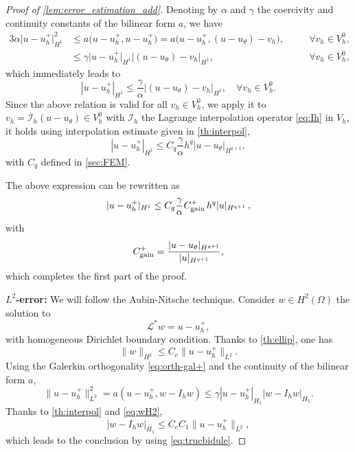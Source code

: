 \begin{proof}[Proof of \cref{lem:error_estimation_add}]
    Denoting by $\alpha$ and $\gamma$ the
    coercivity and continuity constants of the bilinear form $a$, we have
    \begin{alignat*}{3}
        \alpha \big| u-u_h^+\big|_{H^1}^2 & \leq
        a\big(u-u_h^+,u-u_h^+\big) =
        a\big(u-u_h^+,(u-u_{\theta})-v_h\big),
                                          &      & \quad \forall v_h \in V_h^0, \\
                                          & \leq
        \gamma \big| u-u_h^+\big|_{H^1} \big| (u-u_{\theta})-v_h \big|_{H^1},
                                          &      & \quad \forall v_h \in V_h^0,
    \end{alignat*}
    which immediately leads to
    \[
        | u-u_h^+|_{H^1} \leq \frac{\gamma}{\alpha} \big| (u-u_{\theta})-v_h \big|_{H^1}, \quad \forall v_h \in V_h^0.
    \]
    Since the above relation is valid for all $v_h \in V_h^0$,
    we apply it to $v_h=\mathcal{I}_h(u-u_\theta) \in V_h^0$
    with $\mathcal{I}_h$ the Lagrange interpolation operator \eqref{eq:Ih} in $V_h$, it holds
    using interpolation estimate given in \cref{th:interpol},
    \[
        |u-u_h^+|_{H^1} \leq C_q\frac{\gamma}{\alpha} h^{q} | u-u_{\theta} |_{H^{q+1}},
    \]
    with $C_q$ defined in \cref{sec:FEM}.

    The above expression can be rewritten as
    \begin{equation}\label{eq:trucbidule}
        | u-u_h^+|_{H^1} \leq C_q\frac{\gamma}{\alpha}  C_\text{\rm gain}^+ \, h^{q}|u|_{H^{q+1}} \,,
    \end{equation}
    with
    \[
        C_\text{\rm gain}^+ = \frac{| u-u_{\theta} |_{H^{q+1}}}{| u |_{H^{q+1}}},
    \]
    which completes the first part of the proof.

    \textbf{$L^2$-error:}
    We will follow the Aubin-Nitsche technique.
    Consider $w\in H^2(\Omega)$ the solution to
    $$\mathcal{L}^* w=u-u_h^+,$$
    with homogeneous Dirichlet boundary condition.
    Thanks to \cref{th:ellip}, one has
    \begin{equation}\label{eq:wH2}
        \|w\|_{H^2}\leqslant C_e\|u-u_h^+\|_{L^2}.
    \end{equation}
    Using the Galerkin orthogonality \eqref{eq:orth-gal+} and the continuity of the bilinear form $a$,
    $$\|u-u_h^+\|_{L^2}^2
        = a(u-u_h^+,w-I_hw)
        \leq \gamma |u-u_h^+|_{H_1}|w-I_hw|_{H_1}.$$
    Thanks to \cref{th:interpol}
    and \eqref{eq:wH2},
    $$|w-I_hw|_{H_1}\leq C_eC_1\|u-u_h^+\|_{L^2},$$
    which leads to the conclusion by using \eqref{eq:trucbidule}.
\end{proof}

